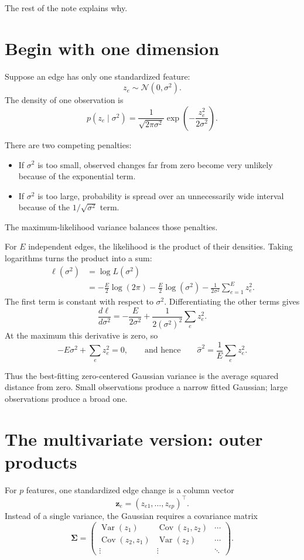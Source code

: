 \documentclass[10pt]{article}
\newcommand{\Normal}{\mathcal{N}}
\newcommand{\Var}{\operatorname{Var}}
\begin{document}
The rest of the note explains why.

\section{Begin with one dimension}

Suppose an edge has only one standardized feature:
\[
  z_e\sim\Normal(0,\sigma^2).
\]
The density of one observation is
\[
  p(z_e\mid\sigma^2)
  =\frac{1}{\sqrt{2\pi\sigma^2}}
   \exp\!\left(-\frac{z_e^2}{2\sigma^2}\right).
\]

There are two competing penalties:

\begin{itemize}
  \item If $\sigma^2$ is too small, observed changes far from zero become very
        unlikely because of the exponential term.
  \item If $\sigma^2$ is too large, probability is spread over an unnecessarily
        wide interval because of the $1/\sqrt{\sigma^2}$ term.
\end{itemize}

The maximum-likelihood variance balances those penalties.

For $E$ independent edges, the likelihood is the product of their densities.
Taking logarithms turns the product into a sum:
\begin{align*}
  \ell(\sigma^2)
  &=\log L(\sigma^2)\\
  &=-\frac{E}{2}\log(2\pi)
    -\frac{E}{2}\log(\sigma^2)
    -\frac{1}{2\sigma^2}\sum_{e=1}^{E}z_e^2.
\end{align*}
The first term is constant with respect to $\sigma^2$.  Differentiating the
other terms gives
\[
  \frac{d\ell}{d\sigma^2}
  =-\frac{E}{2\sigma^2}
   +\frac{1}{2(\sigma^2)^2}\sum_e z_e^2.
\]
At the maximum this derivative is zero, so
\[
 -E\sigma^2+\sum_e z_e^2=0,
 \qquad\text{and hence}\qquad
 \boxed{\widehat{\sigma}^2=\frac{1}{E}\sum_e z_e^2.}
\]

Thus the best-fitting zero-centered Gaussian variance is the average squared
distance from zero.  Small observations produce a narrow fitted Gaussian;
large observations produce a broad one.

\section{The multivariate version: outer products}

For $p$ features, one standardized edge change is a column vector
\[
  \mathbf z_e=(z_{e1},\ldots,z_{ep})^\top.
\]
Instead of a single variance, the Gaussian requires a covariance matrix
\[
  \boldsymbol\Sigma=
  \begin{pmatrix}
    \Var(z_1) & \operatorname{Cov}(z_1,z_2) & \cdots\\
    \operatorname{Cov}(z_2,z_1) & \Var(z_2) & \cdots\\
    \vdots&\vdots&\ddots
  \end{pmatrix}.
\]
\end{document}
